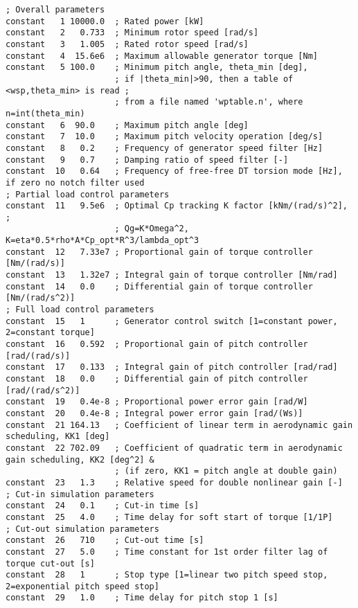 \begin{table}[t!]
\begin{center}
\scriptsize
\begin{verbatim}
; Overall parameters
constant   1 10000.0  ; Rated power [kW]
constant   2   0.733  ; Minimum rotor speed [rad/s]
constant   3   1.005  ; Rated rotor speed [rad/s]
constant   4  15.6e6  ; Maximum allowable generator torque [Nm]
constant   5 100.0    ; Minimum pitch angle, theta_min [deg],
                      ; if |theta_min|>90, then a table of <wsp,theta_min> is read ;
                      ; from a file named 'wptable.n', where n=int(theta_min)
constant   6  90.0    ; Maximum pitch angle [deg]
constant   7  10.0    ; Maximum pitch velocity operation [deg/s]
constant   8   0.2    ; Frequency of generator speed filter [Hz]
constant   9   0.7    ; Damping ratio of speed filter [-]
constant  10   0.64   ; Frequency of free-free DT torsion mode [Hz], if zero no notch filter used
; Partial load control parameters
constant  11   9.5e6  ; Optimal Cp tracking K factor [kNm/(rad/s)^2], ;
                      ; Qg=K*Omega^2, K=eta*0.5*rho*A*Cp_opt*R^3/lambda_opt^3
constant  12   7.33e7 ; Proportional gain of torque controller [Nm/(rad/s)]
constant  13   1.32e7 ; Integral gain of torque controller [Nm/rad]
constant  14   0.0    ; Differential gain of torque controller [Nm/(rad/s^2)]
; Full load control parameters
constant  15   1      ; Generator control switch [1=constant power, 2=constant torque]
constant  16   0.592  ; Proportional gain of pitch controller [rad/(rad/s)]
constant  17   0.133  ; Integral gain of pitch controller [rad/rad]
constant  18   0.0    ; Differential gain of pitch controller [rad/(rad/s^2)]
constant  19   0.4e-8 ; Proportional power error gain [rad/W]
constant  20   0.4e-8 ; Integral power error gain [rad/(Ws)]
constant  21 164.13   ; Coefficient of linear term in aerodynamic gain scheduling, KK1 [deg]
constant  22 702.09   ; Coefficient of quadratic term in aerodynamic gain scheduling, KK2 [deg^2] &
                      ; (if zero, KK1 = pitch angle at double gain)
constant  23   1.3    ; Relative speed for double nonlinear gain [-]
; Cut-in simulation parameters
constant  24   0.1    ; Cut-in time [s]
constant  25   4.0    ; Time delay for soft start of torque [1/1P]
; Cut-out simulation parameters
constant  26   710    ; Cut-out time [s]
constant  27   5.0    ; Time constant for 1st order filter lag of torque cut-out [s]
constant  28   1      ; Stop type [1=linear two pitch speed stop, 2=exponential pitch speed stop]
constant  29   1.0    ; Time delay for pitch stop 1 [s]

\end{verbatim}
\end{center}
\end{table}
